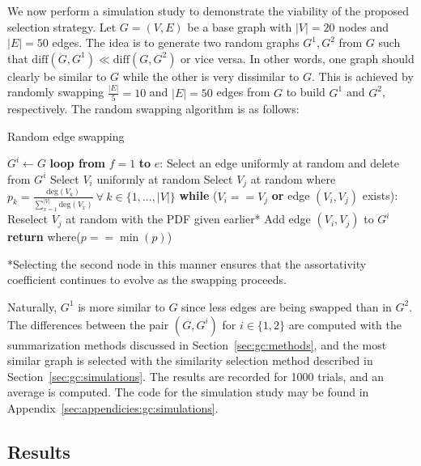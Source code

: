 We now perform a simulation study to demonstrate the viability of the proposed 
selection strategy. Let $G=(V,E)$ be a base graph with $|V|=20$ nodes and 
$|E|=50$ edges. The idea is to generate two random graphs $G^1, G^2$ from $G$ 
such that $\text{diff}(G,G^1) \ll \text{diff}(G,G^2)$ or vice versa. 
In other words, one graph should clearly be similar to $G$ while the other is 
very dissimilar to $G$. This is achieved by randomly swapping $\frac{|E|}{5} = 
10$ and $|E| = 50$ edges from $G$ to build $G^1$ and $G^2$, respectively. 
The random swapping algorithm is as follows:

\tablespacing
\begin{algorithm}[H]
	\caption{Random edge swapping}\label{alg:gc:simulations:swapping}
	\begin{algorithmic}[1]
		\State $G^i \gets G$
		\State \textbf{loop from} $f=1$ \textbf{to} $e$:
		\State \indent Select an edge uniformly at random and delete from $G^i$
		\State \indent Select $V_i$ uniformly at random
		\State \indent Select $V_j$ at random where 
		$p_k = \frac{\text{deg}(V_k)}{\sum\limits_{x=1}^{|V|} \text{deg}(V_x)} 
		\ \forall \
		k \in \{1,...,|V|\}$
		\State \indent \textbf{while} ($V_i == V_j$ \textbf{or} edge 
		$(V_i,V_j)$ exists):
		\State \indent \indent Reselect $V_j$ at random with the PDF given 
		earlier*
		\State \indent Add edge $(V_i,V_j)$ to $G^i$
		\State \textbf{return} where($p==\min{(p)}$)
		\EndProcedure
	\end{algorithmic}
	*Selecting the second node in this manner ensures that the assortativity 
	coefficient continues to evolve as the swapping proceeds. 
\end{algorithm}
\bodyspacing

\noindent Naturally, $G^1$ is more similar to $G$ since less 
edges are being swapped than in $G^2$. The differences between the pair 
$(G,G^i)$ for $i \in \{1,2\}$ are computed with the summarization 
methods discussed in Section~\ref{sec:gc:methods}, and the most similar 
graph is selected with the similarity selection method described in 
Section~\ref{sec:gc:simulations}. 
The results are recorded for 1000 trials, and an average is computed. 
The code for the simulation study may be found in 
Appendix~\ref{sec:appendicies:gc:simulations}. 

\subsection{Results}
\label{sec:gc:simulations:results}

